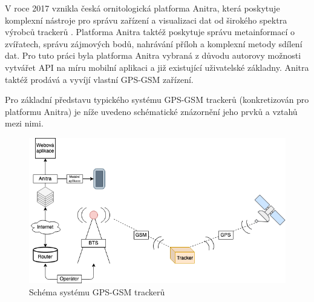 V roce 2017 vznikla česká ornitologická platforma Anitra, která poskytuje komplexní nástroje pro správu zařízení a visualizaci dat od širokého spektra výrobců trackerů \cite{krouzkovaniPtakuAnitra}. Platforma Anitra taktéž poskytuje správu metainformací o zvířatech, správu zájmových bodů, nahrávání příloh a komplexní metody sdílení dat. Pro tuto práci byla platforma Anitra vybraná z důvodu autorovy možnosti vytvářet API na míru mobilní aplikaci a již existující uživatelské základny. Anitra taktéž prodává a vyvíjí vlastní GPS-GSM zařízení.

Pro základní představu typického systému GPS-GSM trackerů (konkretizován pro platformu Anitra) je níže uvedeno schématické znázornění jeho prvků a vztahů mezi nimi.

\begin{figure}[h]
	\includegraphics[width=\linewidth]{img/diagram_system.png}
	\caption{Schéma systému GPS-GSM trackerů}
	\label{fig:boat1}
\end{figure}